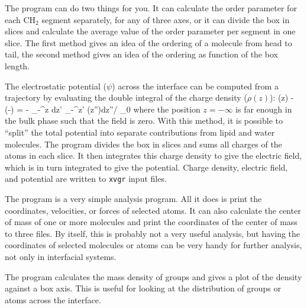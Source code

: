 The program can do two things for you. It can calculate the order
parameter for each CH$_2$ segment separately, for any of three axes,
or it can divide the box in slices and calculate the average value of
the order parameter per segment in one slice. The first method gives
an idea of the ordering of a molecule from head to tail, the second
method gives an idea of the ordering as function of the box length.

The electrostatic potential ($\psi$) across the interface can be
computed from a trajectory by evaluating the double integral of the
charge density ($\rho(z)$):
\beq
\psi(z) - \psi(-\infty) = - \int_{-\infty}^z dz' \int_{-\infty}^{z'} \rho(z'')dz''/ \epsilon_0 
\label{eqn:elpotgr}
\eeq
where the position $z=-\infty$ is far enough in the bulk phase such that
the field is zero.  With this method, it is possible to ``split'' the
total potential into separate contributions from lipid and water
molecules. The program {\tt {}} divides the box in slices and
sums all charges of the atoms in each slice. It then integrates this
charge density to give the electric field, which is in turn integrated to
give the potential. Charge density, electric field, and potential are written
to {\tt xvgr} input files.

The program {\tt {}} is a very simple analysis program. All it
does is print the coordinates, velocities, or forces of selected atoms.
It can also calculate the center of mass of one or more
molecules and print the coordinates of the center of mass to three
files. By itself, this is probably not a very useful analysis, but
having the coordinates of selected molecules or atoms can be very
handy for further analysis, not only in interfacial systems.

The program {\tt {}} calculates the mass density of
groups and gives a plot of the density against a box
axis. This is useful for looking at the distribution of groups or
atoms across the interface.



